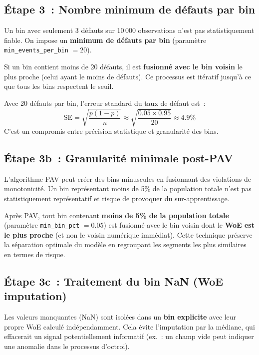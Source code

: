 \documentclass[12pt,a4paper]{article}
\begin{document}
\subsection{\'Etape 3~: Nombre minimum de d\'efauts par bin}

Un bin avec seulement 3 d\'efauts sur 10\,000 observations n'est pas statistiquement fiable. On impose un \textbf{minimum de d\'efauts par bin} (param\`etre \texttt{min\_events\_per\_bin} $= 20$).

Si un bin contient moins de 20 d\'efauts, il est \textbf{fusionn\'e avec le bin voisin} le plus proche (celui ayant le moins de d\'efauts). Ce processus est it\'eratif jusqu'\`a ce que tous les bins respectent le seuil.

\begin{interpretbox}[Pourquoi 20~?]
Avec 20 d\'efauts par bin, l'erreur standard du taux de d\'efaut est~:
$$\text{SE} = \sqrt{\frac{p(1-p)}{n}} \approx \sqrt{\frac{0.05 \times 0.95}{20}} \approx 4.9\%$$
C'est un compromis entre pr\'ecision statistique et granularit\'e des bins.
\end{interpretbox}

\subsection{\'Etape 3b~: Granularit\'e minimale post-PAV}

L'algorithme PAV peut cr\'eer des bins minuscules en fusionnant des violations de monotonicit\'e. Un bin repr\'esentant moins de 5\% de la population totale n'est pas statistiquement repr\'esentatif et risque de provoquer du sur-apprentissage.

\begin{warningbox}
Apr\`es PAV, tout bin contenant \textbf{moins de 5\% de la population totale} (param\`etre \texttt{min\_bin\_pct} $= 0.05$) est fusionn\'e avec le bin voisin dont le \textbf{WoE est le plus proche} (et non le voisin num\'erique imm\'ediat). Cette technique pr\'eserve la s\'eparation optimale du mod\`ele en regroupant les segments les plus similaires en termes de risque.
\end{warningbox}

\subsection{\'Etape 3c~: Traitement du bin NaN (WoE imputation)}

Les valeurs manquantes (NaN) sont isol\'ees dans un \textbf{bin explicite} avec leur propre WoE calcul\'e ind\'ependamment. Cela \'evite l'imputation par la m\'ediane, qui effacerait un signal potentiellement informatif (ex.~: un champ vide peut indiquer une anomalie dans le processus d'octroi).
\end{document}
